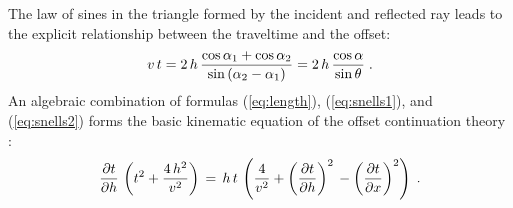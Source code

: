 The law of sines in the triangle formed by the incident and reflected
ray leads to the explicit relationship between the traveltime and the
offset:
\begin{equation}
v\,t = 2\,h\,  {{\cos{\alpha_1}+ \cos{\alpha_2}} \over
\sin{\left(\alpha_2-\alpha_1\right)}} = 2\,h\,{\cos{\alpha} \over
\sin{\theta}} \;.
\label{eq:length} 
\end{equation}
An algebraic combination of formulas (\ref{eq:length}), (\ref{eq:snells1}), and
(\ref{eq:snells2}) forms the basic kinematic equation of the offset
continuation theory \cite[]{ofcon}:
\begin{equation}
{{\partial t} \over {\partial h}} \,
\left(t^2 + {{4\,h^2} \over {v^2}}\right)\,=\,
h\,t\,\left({4 \over {v^2}} + 
\left({{\partial t} \over {\partial h}}\right)^2\,-
\left({{\partial t} \over {\partial x}}\right)^2\right)\;.
\label{eq:OCeikonal}
\end{equation}


